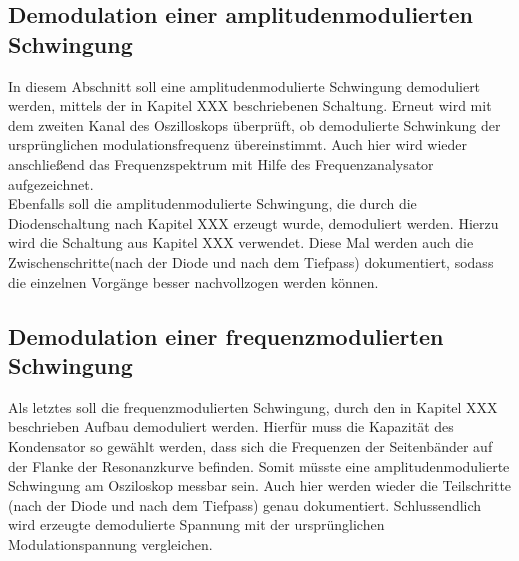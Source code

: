 \subsection{Demodulation einer amplitudenmodulierten Schwingung}
In diesem Abschnitt soll eine amplitudenmodulierte Schwingung demoduliert werden, mittels der in Kapitel XXX beschriebenen Schaltung. Erneut wird mit dem zweiten Kanal des Oszilloskops überprüft, ob demodulierte Schwinkung der ursprünglichen modulationsfrequenz übereinstimmt. Auch hier wird wieder anschließend das Frequenzspektrum mit Hilfe des Frequenzanalysator aufgezeichnet.
\\
Ebenfalls soll die amplitudenmodulierte Schwingung, die durch die Diodenschaltung nach Kapitel XXX erzeugt wurde, demoduliert werden. Hierzu wird die Schaltung aus Kapitel XXX verwendet. Diese Mal werden auch die Zwischenschritte(nach der Diode und nach dem Tiefpass) dokumentiert, sodass die einzelnen Vorgänge besser nachvollzogen werden können.

\subsection{Demodulation einer frequenzmodulierten Schwingung}
Als letztes soll die frequenzmodulierten Schwingung, durch den in Kapitel XXX beschrieben Aufbau demoduliert werden. Hierfür muss die Kapazität des Kondensator so gewählt werden, dass sich die Frequenzen der Seitenbänder auf der Flanke der Resonanzkurve befinden. Somit müsste eine amplitudenmodulierte Schwingung am Osziloskop messbar sein. Auch hier werden wieder die Teilschritte (nach der Diode und nach dem Tiefpass) genau dokumentiert. Schlussendlich wird erzeugte demodulierte Spannung mit der ursprünglichen Modulationspannung vergleichen. 